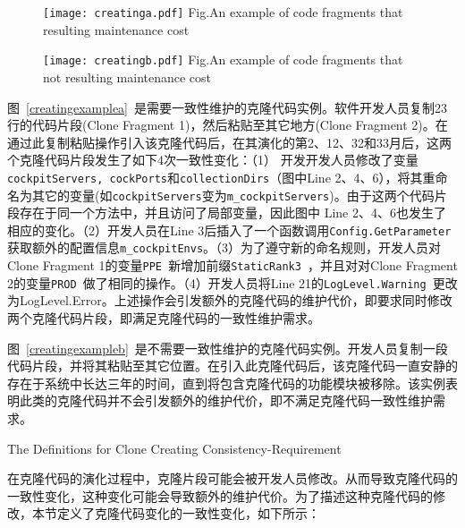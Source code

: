 \begin{figure}[htbp]
\centering
\texttt{[image: creatinga.pdf]}
{Fig.$\!$}{An example of code fragments that resulting maintenance cost}
\vspace{-1em}
\end{figure}

\begin{figure}[htbp]
\centering
\texttt{[image: creatingb.pdf]}
{Fig.$\!$}{An example of code fragments that not resulting maintenance cost}
\vspace{-1em}
\end{figure}

图~\ref{creatingexamplea}~是需要一致性维护的克隆代码实例。软件开发人员复制23行的代码片段(Clone Fragment 1)，然后粘贴至其它地方(Clone Fragment 2)。在通过此复制粘贴操作引入该克隆代码后，在其演化的第2、12、32和33月后，这两个克隆代码片段发生了如下4次一致性变化：（1） 开发开发人员修改了变量{\tt cockpitServers, cockPorts\/}和{\tt collectionDirs}（图中Line 2、4、6），将其重命名为其它的变量(如{\tt cockpitServers\/}变为{\tt m\_cockpitServers\/})。由于这两个代码片段存在于同一个方法中，并且访问了局部变量，因此图中 Line 2、4、6也发生了相应的变化。（2）开发人员在Line 3后插入了一个函数调用{\tt Config.GetParameter\/}获取额外的配置信息{\tt m\_cockpitEnvs\/}。（3）为了遵守新的命名规则，开发人员对Clone Fragment 1的变量{\tt PPE \/}新增加前缀{\tt StaticRank3 \/}，并且对对Clone Fragment 2的变量{\tt PROD \/}做了相同的操作。（4）开发人员将Line 21的{\tt LogLevel.Warning \/}更改为{LogLevel.Error\/}。上述操作会引发额外的克隆代码的维护代价，即要求同时修改两个克隆代码片段，即满足克隆代码的一致性维护需求。

图~\ref{creatingexampleb}~是不需要一致性维护的克隆代码实例。开发人员复制一段代码片段，并将其粘贴至其它位置。在引入此克隆代码后，该克隆代码一直安静的存在于系统中长达三年的时间，直到将包含克隆代码的功能模块被移除。该实例表明此类的克隆代码并不会引发额外的维护代价，即不满足克隆代码一致性维护需求。

{The Definitions for Clone Creating Consistency-Requirement}

在克隆代码的演化过程中，克隆片段可能会被开发人员修改。从而导致克隆代码的一致性变化，这种变化可能会导致额外的维护代价。为了描述这种克隆代码的修改，本节定义了克隆代码变化的一致性变化，如下所示：

